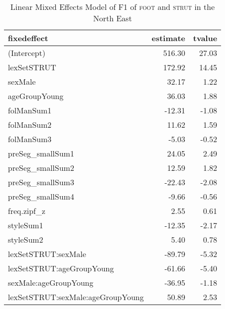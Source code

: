 \begin{table}[ht]
\centering
\begin{tabular}{lrr}
  \hline
fixedeffect & estimate & tvalue \\ 
  \hline
(Intercept) & 516.30 & 27.03 \\ 
  lexSetSTRUT & 172.92 & 14.45 \\ 
  sexMale & 32.17 & 1.22 \\ 
  ageGroupYoung & 36.03 & 1.88 \\ 
  folManSum1 & -12.31 & -1.08 \\ 
  folManSum2 & 11.62 & 1.59 \\ 
  folManSum3 & -5.03 & -0.52 \\ 
  preSeg\_smallSum1 & 24.05 & 2.49 \\ 
  preSeg\_smallSum2 & 12.59 & 1.82 \\ 
  preSeg\_smallSum3 & -22.43 & -2.08 \\ 
  preSeg\_smallSum4 & -9.66 & -0.56 \\ 
  freq.zipf\_z & 2.55 & 0.61 \\ 
  styleSum1 & -12.35 & -2.17 \\ 
  styleSum2 & 5.40 & 0.78 \\ 
  lexSetSTRUT:sexMale & -89.79 & -5.32 \\ 
  lexSetSTRUT:ageGroupYoung & -61.66 & -5.40 \\ 
  sexMale:ageGroupYoung & -36.95 & -1.18 \\ 
  lexSetSTRUT:sexMale:ageGroupYoung & 50.89 & 2.53 \\ 
   \hline
\end{tabular}
\caption{Linear Mixed Effects Model of F1 of \textsc{foot} and \textsc{strut} in the North East \label{tbl:FSF1NE}} 
\end{table}
